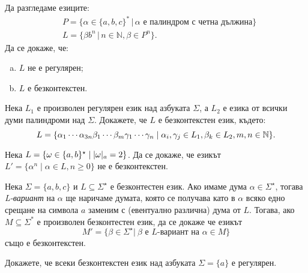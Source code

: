 \begin{problem}
  Да разгледаме езиците:
  \begin{align*}
    & P = \{\alpha\in\{a,b,c\}^*\,|\, \alpha \text{ е палиндром с четна дължина}\} \\
    & L =  \{\beta b^n\,|\, n\in\mathbb{N}, \beta\in P^n\}.
  \end{align*}
  Да се докаже, че:
  \begin{enumerate}[a)]
  \item 
    $L$ не е регулярен;
  \item 
    $L$ е безконтекстен.
  \end{enumerate}
\end{problem}

\begin{problem}
  Нека $L_1$ е произволен регулярен език над азбуката $\Sigma$, 
  а $L_2$ е езика от всички думи палиндроми над $\Sigma$.
  Докажете, че $L$ е безконтекстен език, където:
  \[L = \{\alpha_1 \cdots\alpha_{3n}\beta_1\cdots\beta_m\gamma_1\cdots\gamma_n \mid \alpha_i,\gamma_j \in L_1, \beta_k\in L_2, m,n \in \mathbb{N}\}.\]
\end{problem}

\begin{problem}
  Нека $L = \{\omega\in\{a,b\}^\star \mid \vert{\omega}\vert_{a} = 2\}$.
  Да се докаже, че езикът $L' = \{\alpha^n \mid \alpha\in L, n \geq 0\}$ не е безконтекстен.
\end{problem}


\begin{problem}
  Нека $\Sigma = \{a,b,c\}$ и $L \subseteq \Sigma^\star$ е безконтестен език. Ако имаме дума 
  $\alpha \in \Sigma^\star$, тогава \emph{L-вариант} на $\alpha$ ще наричаме думата, която се получава като в $\alpha$ всяко едно 
  срещане на символа $a$ заменим с (евентуално различна) дума от $L$.
  Тогава, ако $M \subseteq \Sigma^*$ е произволен безконтестен език, да се докаже че езикът
  \begin{equation*}
    M' = \{\beta\in\Sigma^\star |\ \beta \text{ е $L$-вариант на } \alpha \in M \}
  \end{equation*}
  също е безконтекстен.
\end{problem}

\begin{problem}
  Докажете, че всеки безконтекстен език над азбуката $\Sigma = \{a\}$
  е регулярен.
\end{problem}
\ifhints
\begin{hint}
  
\end{hint}
\fi

